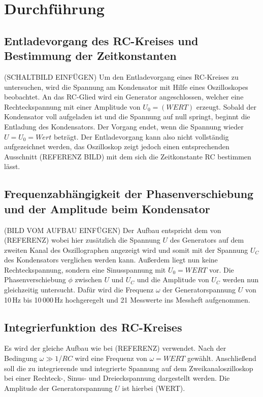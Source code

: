 \section{Durchführung}
\label{sec:Durchführung}
\subsection{Entladevorgang des RC-Kreises und Bestimmung der Zeitkonstanten}
(SCHALTBILD EINFÜGEN)
Um den Entladevorgang eines RC-Kreises zu untersuchen,
wird die Spannung am Kondensator mit Hilfe eines
Oszilloskopes beobachtet. An das RC-Glied wird ein 
Generator angeschlossen, welcher eine Rechteckspannung
mit einer Amplitude von $U_0=(WERT)$ erzeugt.
Sobald der Kondensator voll aufgeladen ist und die Spannung
auf null springt, beginnt die Entladung des Kondensators.
Der Vorgang endet, wenn die Spannung wieder $U=U_0=Wert$
beträgt. Der Entladevorgang kann also nicht vollständig
aufgezeichnet werden, das Oszilloskop zeigt jedoch
einen entsprechenden Ausschnitt (REFERENZ BILD) mit dem
sich die Zeitkonstante RC bestimmen lässt.


\subsection{Frequenzabhängigkeit der Phasenverschiebung und der Amplitude beim Kondensator}
(BILD VOM AUFBAU EINFÜGEN)
Der Aufbau entspricht dem von (REFERENZ) wobei hier
zusätzlich die Spannung $U$ des Generators auf dem
zweiten Kanal des Oszillographen angezeigt wird und
somit mit der Spannung $U_C$ des Kondensators verglichen
werden kann. Außerdem liegt nun keine Rechteckspannung,
sondern eine Sinusspannung mit $U_0=WERT$ vor.
Die Phasenverschiebung $\phi$ zwischen $U$ und $U_C$
und die Amplitude von $U_C$ werden nun gleichzeitig
untersucht. Dafür wird die Frequenz $\omega$ der
Generatorspannung $U$ von 10\,Hz bis 10\,000\,Hz
hochgeregelt und 21 Messwerte ins Messheft aufgenommen.

\subsection{Integrierfunktion des RC-Kreises}
Es wird der gleiche Aufbau wie bei (REFERENZ) verwendet.
Nach der Bedingung $\omega \gg 1$/$RC$ wird
eine Frequenz von $\omega=WERT$ gewählt.
Anschließend soll die zu integrierende und integrierte
Spannung auf dem Zweikanaloszilloskop bei einer
Rechteck-, Sinus- und Dreieckspannung dargestellt werden.
Die Amplitude der Generatorspannung $U$ ist hierbei
(WERT).
